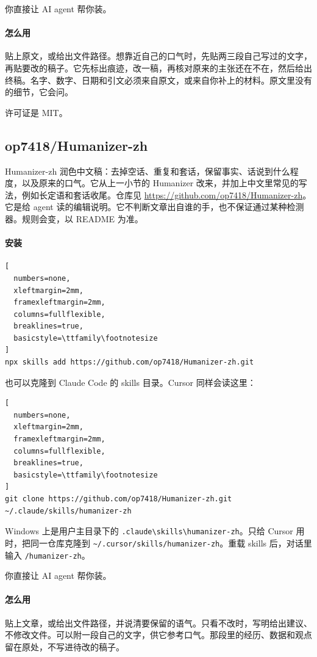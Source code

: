 \begin{xiaonao}
你直接让 AI agent 帮你装。
\end{xiaonao}

\paragraph{怎么用}
贴上原文，或给出文件路径。想靠近自己的口气时，先贴两三段自己写过的文字，再贴要改的稿子。它先标出痕迹，改一稿，再核对原来的主张还在不在，然后给出终稿。名字、数字、日期和引文必须来自原文，或来自你补上的材料。原文里没有的细节，它会问。

许可证是 MIT。


\subsection{op7418/Humanizer-zh}
Humanizer-zh 润色中文稿：去掉空话、重复和套话，保留事实、话说到什么程度，以及原来的口气。它从上一小节的 Humanizer 改来，并加上中文里常见的写法，例如长定语和套话收尾。仓库见 \url{https://github.com/op7418/Humanizer-zh}。它是给 agent 读的编辑说明。它不判断文章出自谁的手，也不保证通过某种检测器。规则会变，以 README 为准。

\paragraph{安装}
\begin{lstlisting}[
  numbers=none,
  xleftmargin=2mm,
  framexleftmargin=2mm,
  columns=fullflexible,
  breaklines=true,
  basicstyle=\ttfamily\footnotesize
]
npx skills add https://github.com/op7418/Humanizer-zh.git
\end{lstlisting}
也可以克隆到 Claude Code 的 skills 目录。Cursor 同样会读这里：
\begin{lstlisting}[
  numbers=none,
  xleftmargin=2mm,
  framexleftmargin=2mm,
  columns=fullflexible,
  breaklines=true,
  basicstyle=\ttfamily\footnotesize
]
git clone https://github.com/op7418/Humanizer-zh.git ~/.claude/skills/humanizer-zh
\end{lstlisting}
Windows 上是用户主目录下的 \verb|.claude\skills\humanizer-zh|。只给 Cursor 用时，把同一仓库克隆到 \verb|~/.cursor/skills/humanizer-zh|。重载 skills 后，对话里输入 \verb|/humanizer-zh|。

\begin{xiaonao}
你直接让 AI agent 帮你装。
\end{xiaonao}

\paragraph{怎么用}
贴上文章，或给出文件路径，并说清要保留的语气。只看不改时，写明给出建议、不修改文件。可以附一段自己的文字，供它参考口气。那段里的经历、数据和观点留在原处，不写进待改的稿子。

